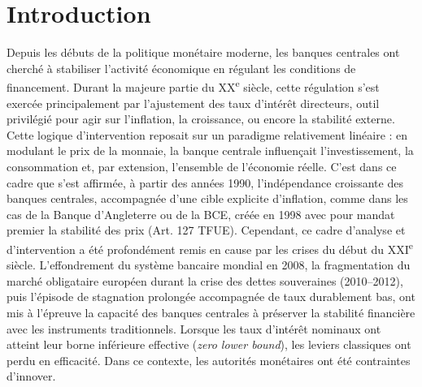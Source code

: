 \chapter*{Introduction}

Depuis les débuts de la politique monétaire moderne, les banques centrales ont cherché à stabiliser l’activité 
économique en régulant les conditions de financement. Durant la majeure partie du XX\textsuperscript{e} siècle, cette 
régulation s’est exercée principalement par l’ajustement des taux d’intérêt directeurs, outil privilégié pour agir sur 
l’inflation, la croissance, ou encore la stabilité externe. Cette logique d’intervention reposait sur un paradigme 
relativement linéaire : en modulant le prix de la monnaie, la banque centrale influençait l’investissement, la 
consommation et, par extension, l’ensemble de l’économie réelle. C’est dans ce cadre que s’est affirmée, à partir des 
années 1990, l’indépendance croissante des banques centrales, accompagnée d’une cible explicite d’inflation, comme 
dans les cas de la Banque d’Angleterre ou de la BCE, créée en 1998 avec pour mandat premier la stabilité des prix 
(Art. 127 TFUE). Cependant, ce cadre d’analyse et d’intervention a été profondément remis en cause par les crises du 
début du XXI\textsuperscript{e} siècle. L’effondrement du système bancaire mondial en 2008, la fragmentation du marché 
obligataire européen durant la crise des dettes souveraines (2010–2012), puis l’épisode de stagnation prolongée 
accompagnée de taux durablement bas, ont mis à l’épreuve la capacité des banques centrales à préserver la stabilité 
financière avec les instruments traditionnels. Lorsque les taux d’intérêt nominaux ont atteint leur borne inférieure 
effective (\textit{zero lower bound}), les leviers classiques ont perdu en efficacité. Dans ce contexte, les autorités monétaires ont été contraintes d’innover.\\

